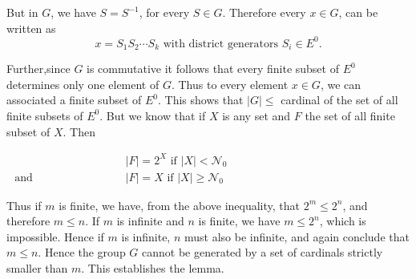   But in $G$, we have $S=S^{-1}$, for every $S \in 
  G$. Therefore every $x \in  G$, can be written as 
  $$
  x=S_1S_2 \cdots S_k \text{ with district generators } S_i \in  E^0.
  $$
  
  Further,\pageoriginale since $G$ is commutative it follows that every finite
  subset of $E^0$ determines only one element of $G$. Thus to every
  element $x \in  G$, we can associated a finite subset of
  $E^0$. This shows that $|G|\leq$ cardinal of the set of all finite
  subsets of $E^0$. But we know that if $X$ is any set and $F$ the set
  of all finite subset of $X$. Then 

\noindent $\begin{aligned}
    & |F|= 2^X \text{ if }|X|< \mathcal{N}_0\\
    \text{ and } \hspace{3cm} &|F|= X \text{ if }|X|\geq \mathcal{N}_0
  \end{aligned}
$

  Thus if $m$ is finite, we have, from the above inequality, that $2^m
  \leq 2^n$, and therefore $m \leq n$. If $m$ is infinite and $n$ is
  finite, we have $m \leq 2^n$, which is impossible. Hence if $m$ is
  infinite, $n$ must also be infinite, and again conclude that $m \leq
  n$. Hence the group $G$ cannot be generated by a set of cardinals
  strictly smaller than $m$. This establishes the lemma. 

